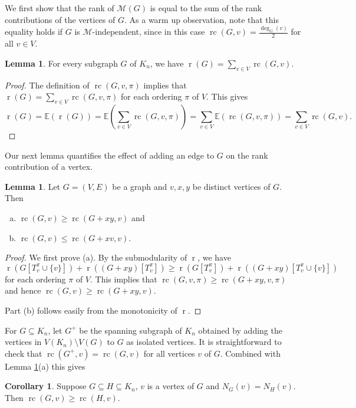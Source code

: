 \documentclass[11pt,a4paper]{article}
\theoremstyle{definition}
\newtheorem{lemma}[theorem]{Lemma}
\newtheorem{corollary}[theorem]{Corollary}
\DeclareMathOperator{\rr}{r}
\DeclareMathOperator{\rc}{rc}
\newcommand{\cM}{\mathcal{M}}
\newcommand{\E}{\mathbb{E}}
\begin{document}
We first show that the rank of $\cM(G)$ is equal to the sum of the rank contributions of the vertices of $G$. As a warm up observation, note that this equality holds if $G$ is $\cM$-independent, since in this case $\rc(G,v)=\frac{\deg_G(v)}{2}$ for all $v\in V$.

\begin{lemma} \label{lem:rc_sum}
For every subgraph $G$ of $K_n$, we have ${\displaystyle \rr(G)=\sum_{v\in V} \rc(G,v)}.$ 
\end{lemma} 
\begin{proof} The definition of $\rc(G, v, \pi)$ implies that $\rr(G)=\sum_{v\in V}\rc(G, v, \pi)$ for each ordering $\pi$ of $V$. This gives
$$ \rr(G)=\E(\rr(G))=\E\left(\sum_{v\in V}\rc(G, v, \pi)\right)=\sum_{v\in V}\E\left(\rc(G, v, \pi)\right)= \sum_{v\in V} \rc(G,v).$$
\end{proof}






Our next lemma 
quantifies the effect of adding an edge to $G$ on the rank contribution of a vertex. 
\begin{lemma}\label{lem:new_edge}
Let $G=(V,E)$ be a graph and $v, x,y$ be distinct vertices of $G$. Then 
\begin{enumerate}[(a)]
\item $\rc(G,v)\geq \rc(G+xy,v)$ and 
\item $\rc(G,v)\leq \rc(G+xv,v)$. 
\end{enumerate}
\end{lemma}
\begin{proof}
We first prove (a). By the submodularity of $\rr$, we have
$$ \rr(G[T_v^\pi\cup \{v\}])+\rr((G+xy)[T_v^\pi])\geq \rr(G[T_v^\pi]) + \rr((G+xy)[T_v^\pi\cup  \{v\}])$$ for each ordering $\pi$ of $V$. This implies that $\rc(G,v,\pi)\geq \rc(G+xy,v,\pi)$ and hence  $\rc(G,v)\geq \rc(G+xy,v).$ 

Part (b) follows easily from the monotonicity of $\rr$.
\end{proof}

For $G\subseteq K_n$, let $G^+$ be the spanning subgraph of $K_n$ obtained by adding the vertices in $V(K_n)\setminus V(G)$ to $G$ as isolated vertices. It is straightforward to check that $\rc(G^+,v)=\rc(G,v)$ %
for all  vertices $v$ of $G$. Combined with Lemma \ref{lem:new_edge}(a) this gives

\begin{corollary}\label{cor:new_edge}
Suppose $G\subseteq H\subseteq K_n$, $v$ is a vertex of $G$ and $N_G(v)=N_H(v)$. Then $\rc(G,v)\geq \rc(H,v)$. 
\end{corollary}
\end{document}
